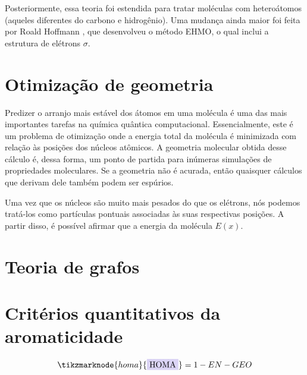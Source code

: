 
Posteriormente, essa teoria foi estendida para tratar moléculas com heteroátomos (aqueles diferentes do carbono e hidrogênio)\autocite{Liwschitz1963}. Uma mudança ainda maior foi feita por Roald Hoffmann \autocite{Hoffmann1963}, que desenvolveu o método \gls{EHMO}, o qual inclui a estrutura de elétrons $\sigma$.

\section{Otimização de geometria}

Predizer o arranjo mais estável dos átomos em uma molécula é uma das mais importantes tarefas na química quântica computacional. Essencialmente, este é um problema de otimização onde a energia total da molécula é minimizada com relação às posições dos núcleos atômicos. A geometria molecular obtida desse cálculo é, dessa forma, um ponto de partida para inúmeras simulações de propriedades moleculares. Se a geometria não é acurada, então quaisquer cálculos que derivam dele também podem ser espúrios.

Uma vez que os núcleos são muito mais pesados do que os elétrons, nós podemos tratá-los como partículas pontuais associadas às suas respectivas posições. A partir disso, é possível afirmar que a energia da molécula $E(x)$.

\section{Teoria de grafos}

\section{Critérios quantitativos da aromaticidade}

\begin{figure}[htb]
    \vspace{2\baselineskip}
\begin{equation}
    \label{correcao}
    \tikzmarknode{homa}{\highlight{blue}{HOMA}} = 1 - EN - GEO
\end{equation}
\end{figure}



